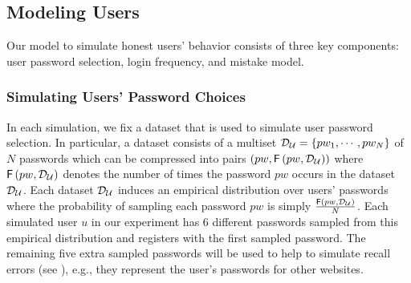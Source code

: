 

\subsection{Modeling Users} \label{section:ExperimentDesign-subsection:SimulateUser}

Our model to simulate honest users' behavior consists of three key components: user password selection, login frequency, and mistake model. 





\subsubsection{Simulating Users’ Password Choices}\label{section:ExperimentDesign-subsection:SimulateUser-subsubsection:SimulatePasswordChoice}

In each simulation, we fix a dataset that is used to simulate user password selection. In particular, a dataset consists of a multiset $\mathcal{D}_{{\mathcal{U}}} = \{pw_1,\cdots,pw_N\}$ of $N$ passwords which can be compressed into pairs $(pw,  \mathsf{F}\left(pw, \mathcal{D}_{{\mathcal{U}}} \right))$ where $\mathsf{F}\left(pw, \mathcal{D}_{{\mathcal{U}}} \right)$ denotes the number of times the password $pw$ occurs in the dataset $\mathcal{D}_{{\mathcal{U}}}$. Each dataset $\mathcal{D}_{{\mathcal{U}}} $ induces an empirical distribution over users’ passwords where the probability of sampling each password $pw$ is simply $\frac{\mathsf{F}\left(pw, \mathcal{D}_{{\mathcal{U}}}\right)}{N}$. Each simulated user $u$ in our experiment has 6 different passwords sampled from this empirical distribution and registers with the first sampled password. The remaining five extra sampled passwords will be used to help to simulate recall errors (see ), e.g., they represent the user's passwords for other websites. 




